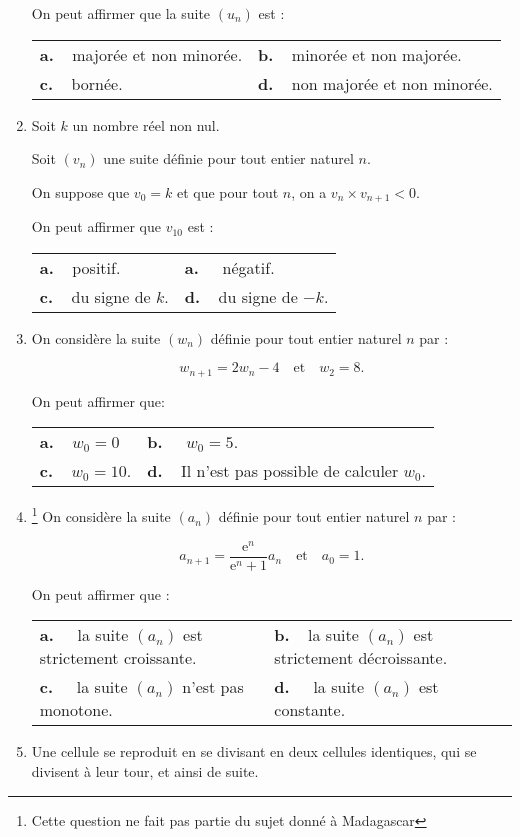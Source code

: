 \documentclass[11pt,a4paper,french]{article}
\begin{document}
\begin{enumerate}
On peut affirmer que la suite $\left(u_n\right)$ est : 

\begin{center}
\begin{tabularx}{\linewidth}{*{2}{X}}
\textbf{a.~~}majorée et non minorée.&\textbf{b.~~}minorée et non majorée.\\
\textbf{c.~~}bornée.				&\textbf{d.~~}non majorée et non minorée.
\end{tabularx}
\end{center}

\item Soit $k$ un nombre réel non nul.

Soit $\left(v_n\right)$  une suite définie pour tout entier naturel $n$.

On suppose que $v_0 = k$ et que pour tout $n$, on a $v_n \times v_{n+1} < 0$.

On peut affirmer que $v_{10}$ est :

\begin{center}
\begin{tabularx}{\linewidth}{*{2}{X}}
\textbf{a.~~}positif. &\textbf{a.~~} négatif.\\
\textbf{c.~~}du signe de $k$.&\textbf{d.~~}du signe de $- k$.
\end{tabularx}
\end{center}
\item On considère la suite $\left(w_n\right)$ définie pour tout entier naturel $n$ par : 

\[w_{n+1} = 2w_n - 4\quad \text{et}\quad  w_2 = 8.\]

On peut affirmer que:

\begin{center}
\begin{tabularx}{\linewidth}{*{2}{X}}
\textbf{a.~~}$w_0 = 0$&\textbf{b.~~} $w_0 = 5$.\\
\textbf{c.~~}$w_0 = 10$.&\textbf{d.~~}Il n'est pas possible de calculer $w_0$.
\end{tabularx}
\end{center}

\item \footnote{Cette question ne fait pas partie du sujet donné à Madagascar} On considère la suite $\left(a_n\right)$ définie pour tout entier naturel $n$ par :

\[a_{n+1} = \dfrac{\text{e}^n}{\text{e}^n + 1}a_n\quad \text{et} \quad a_0 = 1.\]

On peut affirmer que :

\begin{center}
\begin{tabularx}{\linewidth}{*{2}{X}}
\textbf{a.~~} la suite $\left(a_n\right)$ est strictement croissante.&\textbf{b.~~}la suite $\left(a_n\right)$ est strictement décroissante.\\
\textbf{c.~~} la suite $\left(a_n\right)$ n'est pas monotone.&\textbf{d.~~} la suite $\left(a_n\right)$ est constante.
\end{tabularx}
\end{center}
\item Une cellule se reproduit en se divisant en deux cellules identiques, qui se divisent à leur tour, et ainsi de suite. 


\end{enumerate}
\end{document}
